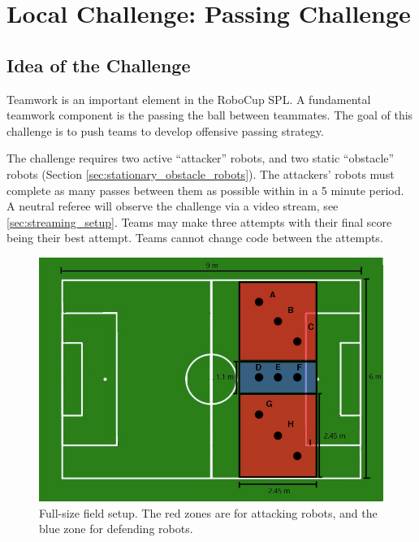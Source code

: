 \section{Local Challenge: Passing Challenge}
\label{sec:PassingChallenge}

\subsection{Idea of the Challenge}
Teamwork is an important element in the RoboCup SPL. A fundamental teamwork component is the passing the ball between teammates. The goal of this challenge is to push teams to develop offensive passing strategy. 

The challenge requires two active ``attacker'' robots, and two static ``obstacle'' robots (\cf Section \ref{sec:stationary_obstacle_robots}). The attackers' robots must complete as many passes between them as possible within in a 5 minute period.
A neutral referee will observe the challenge via a video stream, see \ref{sec:streaming_setup}.
Teams may make three attempts with their final score being their best attempt. Teams cannot change code between the attempts.
\begin{figure}[ht]
\includegraphics[width=0.95\linewidth]{figs/ch_2_full.jpg}
\caption{Full-size field setup. The red zones are for attacking robots, and the blue zone for defending robots. }
\label{ch2:zone96}
\centering
\end{figure}

